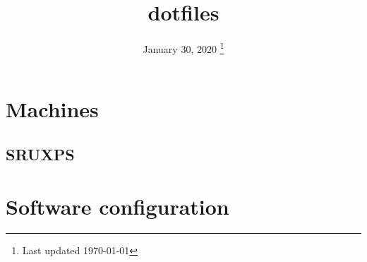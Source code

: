 \documentclass[a4paper,titlepage,xelatex]{tufte-book}
\title{dotfiles}
\date{%
  January 30, 2020
  \thanks{Last updated \today}
}
\begin{document}
\frontmatter
\maketitle
\tableofcontents
\mainmatter

\newpage

\chapter{Machines}
\section{SRUXPS}



\chapter{Software configuration}





















\backmatter



\printglossaries

\nocite{*}



\newpage
\listoftodos[To-Do]
\end{document}
